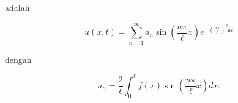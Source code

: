 \documentclass[a4paper,extrafontsizes, 9pt]{memoir}
\begin{document}
\begin{multicols}{3}
adalah

\[
u(x,t) = \sum_{n=1}^{\infty} a_n \sin\left( \frac{n\pi}{\ell} x \right) e^{-\left( \frac{n\pi}{\ell} \right)^2 kt}
\]

dengan

\[
a_n = \frac{2}{\ell} \int_0^{\ell} f(x) \sin\left( \frac{n\pi}{\ell} x \right) dx.
\]
	\end{multicols}
\end{document}
